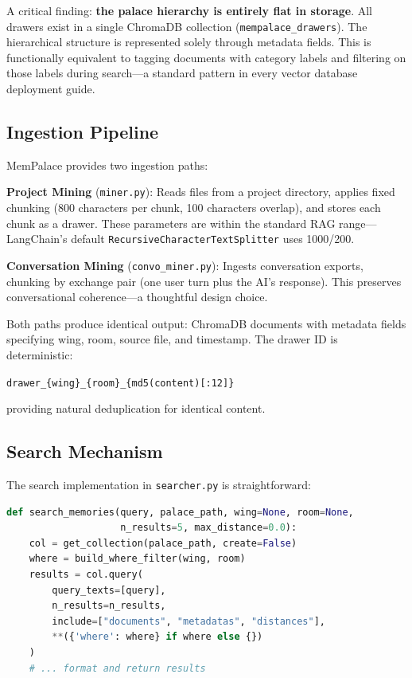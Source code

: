 \documentclass[twoside,11pt]{article}
\begin{document}
A critical finding: \textbf{the palace hierarchy is entirely flat in
storage}.  All drawers exist in a single ChromaDB collection
(\texttt{mempalace\_drawers}).  The hierarchical structure is represented
solely through metadata fields.  This is functionally equivalent to tagging
documents with category labels and filtering on those labels during
search---a standard pattern in every vector database deployment guide.

\subsection{Ingestion Pipeline}

MemPalace provides two ingestion paths:

\textbf{Project Mining} (\texttt{miner.py}): Reads files from a project
directory, applies fixed chunking (800 characters per chunk, 100 characters
overlap), and stores each chunk as a drawer.  These parameters are within the
standard RAG range---LangChain's default
\texttt{Recursive\-Character\-Text\-Splitter} uses 1000/200.

\textbf{Conversation Mining} (\texttt{convo\_miner.py}): Ingests conversation
exports, chunking by exchange pair (one user turn plus the AI's response).
This preserves conversational coherence---a thoughtful design choice.

Both paths produce identical output: ChromaDB documents with metadata fields
specifying wing, room, source file, and timestamp.  The drawer ID is
deterministic:

\smallskip
\centerline{\texttt{drawer\_\{wing\}\_\{room\}\_\{md5(content)[:12]\}}}
\smallskip

\noindent providing natural deduplication for identical content.

\subsection{Search Mechanism}

The search implementation in \texttt{searcher.py} is straightforward:

\begin{lstlisting}[language=Python, caption={Core search function (simplified)}]
def search_memories(query, palace_path, wing=None, room=None,
                    n_results=5, max_distance=0.0):
    col = get_collection(palace_path, create=False)
    where = build_where_filter(wing, room)
    results = col.query(
        query_texts=[query],
        n_results=n_results,
        include=["documents", "metadatas", "distances"],
        **({'where': where} if where else {})
    )
    # ... format and return results
\end{lstlisting}
\end{document}
